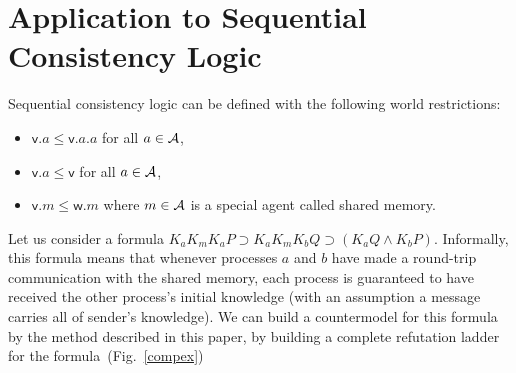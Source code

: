 \section{Application to Sequential Consistency Logic}

Sequential consistency logic can be defined with the following world
restrictions:
\begin{itemize}
 \item $\mathsf v.a\le\mathsf v.a.a$ for all $a\in\mathcal A$,
 \item $\mathsf v.a\le\mathsf v$ for all $a\in\mathcal A$,
 \item $\mathsf v.m\le\mathsf w.m$ where $m\in\mathcal A$ is a special
       agent called shared memory.
\end{itemize}

Let us consider a formula $K_a K_m K_a P\supset K_a K_m K_b Q\supset
(K_a Q\wedge K_b P)$.
Informally, this formula means that whenever processes $a$ and $b$ have
made a round-trip communication with the shared memory, each process is
guaranteed to have received the other process's initial knowledge (with
an assumption a message carries all of sender's knowledge).
We can build a countermodel for this formula by the method described in
this paper, by building
a complete refutation ladder for the formula~(Fig.~\ref{compex})
